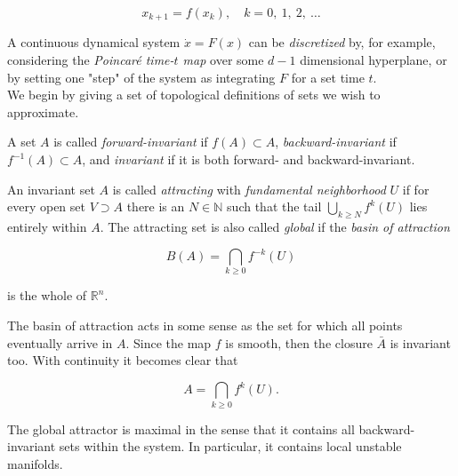 \begin{equation}
    x_{k+1} = f(x_k), \quad k = 0,\ 1,\ 2,\ \dotsc
\end{equation}

A continuous dynamical system $\dot{x} = F(x)$ can be \emph{discretized} by, for example,
considering the \emph{Poincaré time-$t$ map} over some $d-1$ dimensional hyperplane,
or by setting one "step" of the system as integrating $F$ for a set time $t$. \\

We begin by giving a set of topological definitions of sets we wish to approximate.

\begin{definition}
    \cite*{algGAIO} A set $A$ is called \emph{forward-invariant} if $f(A) \subset A$, 
    \emph{backward-invariant} if $f^{-1}(A) \subset A$, and \emph{invariant} if it is
    both forward- and backward-invariant.
\end{definition}

\begin{definition}
    \cite*{subalg} An invariant set $A$ is called \emph{attracting} with \emph{fundamental neighborhood}
    $U$ if for every open set $V \supset A$ there is an $N \in \mathbb{N}$ such that the tail 
    $\bigcup_{k \geq N} f^k(U)$ lies entirely within $A$. The attracting 
    set is also called \emph{global} if the \emph{basin of attraction} 
    
    \begin{equation}
        B(A) = \bigcap\limits_{k \geq 0} f^{-k}(U)
    \end{equation}

    is the whole of $\mathbb{R}^n$.
\end{definition}

The basin of attraction acts in some sense as the set for which all points eventually arrive
in $A$. Since the map $f$ is smooth, then the closure $\bar{A}$ is invariant too. With continuity 
it becomes clear that

\begin{equation}
    A = \bigcap\limits_{k \geq 0} f^k(U).
\end{equation}

The global attractor is maximal in the sense that it contains all backward-invariant 
sets within the system. In particular, it contains local unstable manifolds.


